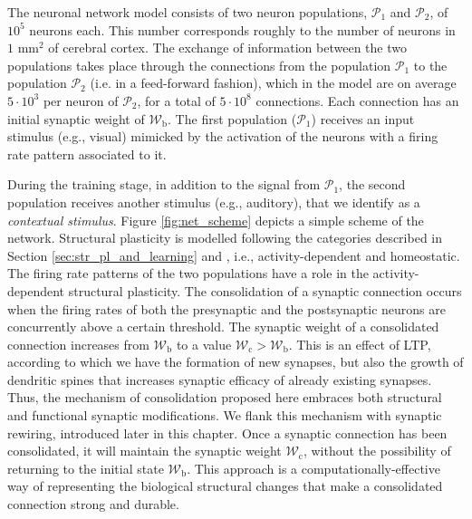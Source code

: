\documentclass[a4paper, 12pt, twoside, openright]{book}
\newcommand{\popI}{\mathcal{P}_1}
\newcommand{\popII}{\mathcal{P}_2}
\newcommand{\Wb}{\mathcal{W}_\text{b}}
\newcommand{\Wc}{\mathcal{W}_\text{c}}
\begin{document}
The neuronal network model consists of two neuron populations, $\popI$ and $\popII$, of $10^5$ neurons each. This number corresponds roughly to the number of neurons in $1 \text{ mm}^2$ of cerebral cortex. The exchange of information between the two populations takes place through the connections from the population $\popI$ to the population $\popII$ (i.e. in a feed-forward fashion), which in the model are on average $5\cdot 10^3 $ per neuron of $\popII$, for a total of $5\cdot 10^8 $ connections. Each connection has an initial synaptic weight of $\Wb$. The first population ($\popI$) receives an input stimulus (e.g., visual) mimicked by the activation of the neurons with a firing rate pattern associated to it.


During the training stage, in addition to the signal from $\popI$, the second population receives another stimulus (e.g., auditory), that we identify as a \textit{contextual stimulus}. Figure \ref{fig:net_scheme} depicts a simple scheme of the network. 
Structural plasticity is modelled following the categories described in Section \ref{sec:str_pl_and_learning} and \cite{Fauth2016}, i.e., activity-dependent and homeostatic. The firing rate patterns of the two populations have a role in the activity-dependent structural plasticity.
The consolidation of a synaptic connection occurs when the firing rates of both the presynaptic and the postsynaptic neurons are concurrently above a certain threshold.
The synaptic weight of a consolidated connection increases from $\Wb$ to a value $\Wc > \Wb$. This is an effect of LTP, according to which we have the formation of new synapses, but also the growth of dendritic spines that increases synaptic efficacy of already existing synapses. Thus, the mechanism of consolidation proposed here embraces both structural and functional synaptic modifications. We flank this mechanism with synaptic rewiring, introduced later in this chapter. Once a synaptic connection has been consolidated, it will maintain the synaptic weight $\Wc$, without the possibility of returning to the initial state $\Wb$. This approach is a computationally-effective way of representing the biological structural changes that make a consolidated connection strong and durable. 
\end{document}

